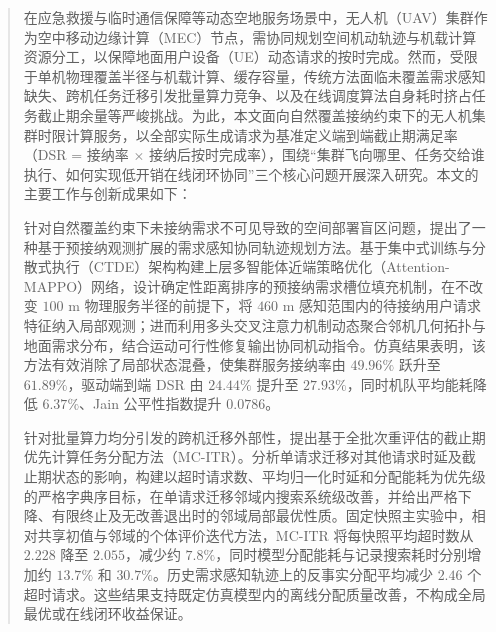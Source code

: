 
\begin{abstract}
在应急救援与临时通信保障等动态空地服务场景中，无人机（UAV）集群作为空中移动边缘计算（MEC）节点，需协同规划空间机动轨迹与机载计算资源分工，以保障地面用户设备（UE）动态请求的按时完成。然而，受限于单机物理覆盖半径与机载计算、缓存容量，传统方法面临未覆盖需求感知缺失、跨机任务迁移引发批量算力竞争、以及在线调度算法自身耗时挤占任务截止期余量等严峻挑战。为此，本文面向自然覆盖接纳约束下的无人机集群时限计算服务，以全部实际生成请求为基准定义端到端截止期满足率（DSR = 接纳率 $\times$ 接纳后按时完成率），围绕“集群飞向哪里、任务交给谁执行、如何实现低开销在线闭环协同”三个核心问题开展深入研究。本文的主要工作与创新成果如下：

针对自然覆盖约束下未接纳需求不可见导致的空间部署盲区问题，提出了一种基于预接纳观测扩展的需求感知协同轨迹规划方法。基于集中式训练与分散式执行（CTDE）架构构建上层多智能体近端策略优化（Attention-MAPPO）网络，设计确定性距离排序的预接纳需求槽位填充机制，在不改变 $100\text{ m}$ 物理服务半径的前提下，将 $460\text{ m}$ 感知范围内的待接纳用户请求特征纳入局部观测；进而利用多头交叉注意力机制动态聚合邻机几何拓扑与地面需求分布，结合运动可行性修复输出协同机动指令。仿真结果表明，该方法有效消除了局部状态混叠，使集群服务接纳率由 $49.96\%$ 跃升至 $61.89\%$，驱动端到端 DSR 由 $24.44\%$ 提升至 $27.93\%$，同时机队平均能耗降低 $6.37\%$、Jain 公平性指数提升 $0.0786$。

针对批量算力均分引发的跨机迁移外部性，提出基于全批次重评估的截止期优先计算任务分配方法（MC-ITR）。分析单请求迁移对其他请求时延及截止期状态的影响，构建以超时请求数、平均归一化时延和分配能耗为优先级的严格字典序目标，在单请求迁移邻域内搜索系统级改善，并给出严格下降、有限终止及无改善退出时的邻域局部最优性质。固定快照主实验中，相对共享初值与邻域的个体评价迭代方法，MC-ITR 将每快照平均超时数从 $2.228$ 降至 $2.055$，减少约 $7.8\%$，同时模型分配能耗与记录搜索耗时分别增加约 $13.7\%$ 和 $30.7\%$。历史需求感知轨迹上的反事实分配平均减少 $2.46$ 个超时请求。这些结果支持既定仿真模型内的离线分配质量改善，不构成全局最优或在线闭环收益保证。


\end{abstract}

